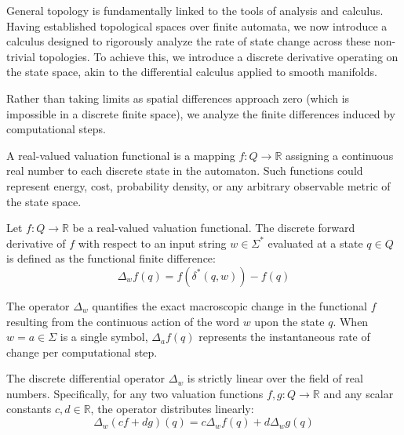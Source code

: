 General topology is fundamentally linked to the tools of analysis and calculus. Having established topological spaces over finite automata, we now introduce a calculus designed to rigorously analyze the rate of state change across these non-trivial topologies. To achieve this, we introduce a discrete derivative operating on the state space, akin to the differential calculus applied to smooth manifolds.

Rather than taking limits as spatial differences approach zero (which is impossible in a discrete finite space), we analyze the finite differences induced by computational steps. 

\begin{definition}
A real-valued valuation functional is a mapping $f: Q \to \mathbb{R}$ assigning a continuous real number to each discrete state in the automaton. Such functions could represent energy, cost, probability density, or any arbitrary observable metric of the state space.
\end{definition}

\begin{definition}
\label{def:discrete_derivative}
Let $f: Q \to \mathbb{R}$ be a real-valued valuation functional. The discrete forward derivative of $f$ with respect to an input string $w \in \Sigma^*$ evaluated at a state $q \in Q$ is defined as the functional finite difference:
\[
\Delta_w f(q) = f(\delta^*(q, w)) - f(q)
\]
\end{definition}

The operator $\Delta_w$ quantifies the exact macroscopic change in the functional $f$ resulting from the continuous action of the word $w$ upon the state $q$. When $w = a \in \Sigma$ is a single symbol, $\Delta_a f(q)$ represents the instantaneous rate of change per computational step.

\begin{lemma}
\label{lem:linearity_derivative}
The discrete differential operator $\Delta_w$ is strictly linear over the field of real numbers. Specifically, for any two valuation functions $f, g: Q \to \mathbb{R}$ and any scalar constants $c, d \in \mathbb{R}$, the operator distributes linearly:
\[
\Delta_w(cf + dg)(q) = c\Delta_w f(q) + d\Delta_w g(q)
\]
\end{lemma}

